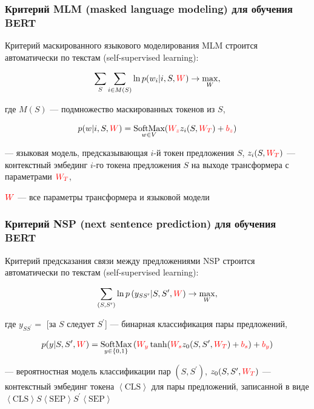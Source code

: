 \documentclass[fullscreen=true, bookmarks=true, hyperref={pdfencoding=unicode}]{beamer}
\begin{document}
\begin{frame}
  \frametitle{Критерий MLM (masked language modeling) для обучения BERT}

  Критерий маскированного языкового моделирования MLM строится автоматически по текстам (self-supervised learning):

  $$ \sum\limits_{S} \sum\limits_{ i \in M(S)} \ln p(w_i|i, S, {\color{red}W}) \to \max\limits_W, $$

  где $M(S)$ — подмножество маскированных токенов из $S$,

  $$ p(w|i, S, {\color{red}W}) = \underset{w \in V}{\text{SoftMax}}({\color{red}W_z}z_i(S, {\color{red}W_T}) + {\color{red}b_z})$$

  — языковая модель, предсказывающая $i$-й токен предложения $S$, $z_i(S, {\color{red}W_T})$ — контекстный эмбединг $i$-го токена предложения $S$ на выходе трансформера с параметрами ${\color{red}W_T}$,

  ${\color{red}W}$ — все параметры трансформера и языковой модели
\end{frame}


\begin{frame}
  \frametitle{Критерий NSP (next sentence prediction) для обучения BERT}

  Критерий предсказания связи между предложениями NSP строится автоматически по текстам (self-supervised learning):

  $$ \sum\limits_{(S, S^\prime)} \ln p\left(y_{SS^\prime}|S, S^\prime, {\color{red}W}\right) \to \max\limits_W, $$

  где $y_{SS^\prime} = $ [за $S$ следует $S^\prime$] — бинарная классификация пары предложений,

  $$ p(y|S, S^\prime, {\color{red}W}) = \underset{y \in \{0,1\}}{\text{SoftMax}}\left({\color{red}W_y} \tanh({\color{red}W_s}z_0(S, S^\prime, {\color{red}W_T}) + {\color{red}b_s}) + {\color{red}b_y}\right)$$

  — вероятностная модель классификации пар $(S, S^\prime)$, $z_0(S, S^\prime, {\color{red}W_T})$ — контекстный эмбединг токена  $\left<\text{CLS}\right>$ для пары предложений, записанной в виде $\left<\text{CLS}\right> S \left<\text{SEP}\right> S^\prime \left<\text{SEP}\right>$
\end{frame}
\end{document}
